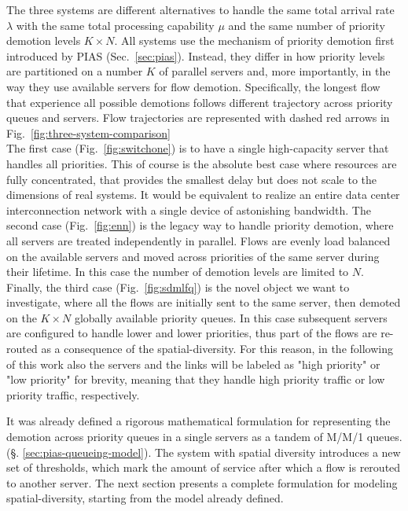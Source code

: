 The three systems are different alternatives to handle the same total arrival rate $\lambda$ with the same total processing capability $\mu$ and the same number of priority demotion levels $K \times N$. All systems use the mechanism of priority demotion first introduced by PIAS (Sec.~\ref{sec:pias}). Instead, they differ in how priority levels are partitioned on a number $K$ of parallel servers and, more importantly, in the way they use available servers for flow demotion. Specifically, the longest flow that experience all possible demotions follows different trajectory across priority queues and servers. Flow trajectories are represented with dashed red arrows in Fig.~\ref{fig:three-system-comparison}\\
The first case (Fig.~\ref{fig:switchone}) is to have a single high-capacity server that handles all priorities. This of course is the absolute best case where resources are fully concentrated, that provides the smallest delay but does not scale to the dimensions of real systems. It would be equivalent to realize an entire data center interconnection network with a single device of astonishing bandwidth. The second case (Fig.~\ref{fig:enn}) is the legacy way to handle priority demotion, where all servers are treated independently in parallel. Flows are evenly load balanced on the available servers and moved across priorities of the same server during their lifetime. In this case the number of demotion levels are limited to $N$. Finally, the third case (Fig.~\ref{fig:sdmlfq}) is the novel object we want to investigate, where all the flows are initially sent to the same server, then demoted on the $K \times N$ globally available priority queues. In this case subsequent servers are configured to handle lower and lower priorities, thus part of the flows are re-routed as a consequence of the spatial-diversity. For this reason, in the following of this work also the servers and the links will be labeled as "high priority" or "low priority" for brevity, meaning that they handle high priority traffic or low priority traffic, respectively. 

It was already defined a rigorous mathematical formulation for representing the demotion across priority queues in a single servers as a tandem of M/M/1 queues. (\S. \ref{sec:pias-queueing-model}). The system with spatial diversity introduces a new set of thresholds, which mark the amount of service after which a flow is rerouted to another server. The next section presents a complete formulation for modeling spatial-diversity, starting from the model already defined. 
